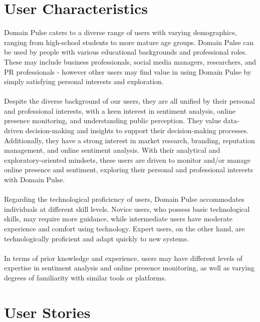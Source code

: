 \documentclass[12pt]{article}
\begin{document}
\section{User Characteristics}

Domain Pulse caters to a diverse range of users with varying demographics, ranging from high-school students to more mature age groups. Domain Pulse can be used by people with various educational backgrounds and professional roles. These may include business professionals, social media managers, researchers, and PR professionals - however other users may find value in using Domain Pulse by simply satisfying personal interests and exploration.\\\\
Despite the diverse background of our users, they are all unified by their personal and professional interests, with a keen interest in sentiment analysis, online presence monitoring, and understanding public perception. They value data-driven decision-making and insights to support their decision-making processes. Additionally, they have a strong interest in market research, branding, reputation management, and online sentiment analysis. With their analytical and exploratory-oriented mindsets, these users are driven to monitor and/or manage online presence and sentiment, exploring their personal and professional interests with Domain Pulse.\\\\
Regarding the technological proficiency of users, Domain Pulse accommodates individuals at different skill levels. Novice users, who possess basic technological skills, may require more guidance, while intermediate users have moderate experience and comfort using technology. Expert users, on the other hand, are technologically proficient and adapt quickly to new systems.\\\\
In terms of prior knowledge and experience, users may have different levels of expertise in sentiment analysis and online presence monitoring, as well as varying degrees of familiarity with similar tools or platforms.

\newpage
















\section{User Stories}
\end{document}
